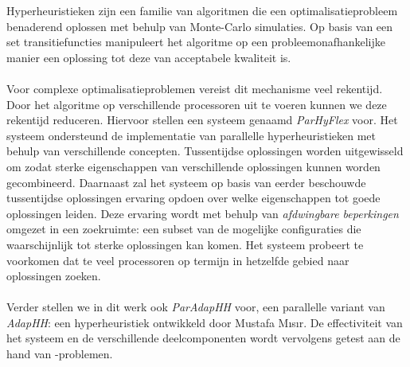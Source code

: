 Hyperheuristieken zijn een familie van algoritmen die een optimalisatieprobleem benaderend oplossen met behulp van Monte-Carlo simulaties. Op basis van een set transitiefuncties manipuleert het algoritme op een probleemonafhankelijke manier een oplossing tot deze van acceptabele kwaliteit is.
\paragraph{}
Voor complexe optimalisatieproblemen vereist dit mechanisme veel rekentijd. Door het algoritme op verschillende processoren uit te voeren kunnen we deze rekentijd reduceren. Hiervoor stellen een systeem genaamd \emph{ParHyFlex} voor. Het systeem ondersteund de implementatie van parallelle hyperheuristieken met behulp van verschillende concepten. Tussentijdse oplossingen worden uitgewisseld om zodat sterke eigenschappen van verschillende oplossingen kunnen worden gecombineerd. Daarnaast zal het systeem op basis van eerder beschouwde tussentijdse oplossingen ervaring opdoen over welke eigenschappen tot goede oplossingen leiden. Deze ervaring wordt met behulp van \emph{afdwingbare beperkingen} omgezet in een zoekruimte: een subset van de mogelijke configuraties die waarschijnlijk tot sterke oplossingen kan komen. Het systeem probeert te voorkomen dat te veel processoren op termijn in hetzelfde gebied naar oplossingen zoeken.
\paragraph{}
Verder stellen we in dit werk ook \emph{ParAdapHH} voor, een parallelle variant van \emph{AdapHH}: een hyperheuristiek ontwikkeld door Mustafa M\i{}s\i{}r. De effectiviteit van het systeem en de verschillende deelcomponenten wordt vervolgens getest aan de hand van -problemen.